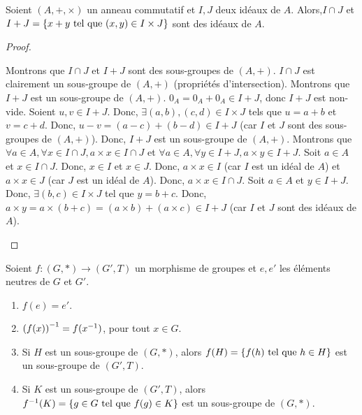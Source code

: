 \documentclass[12pt,a4paper]{report}
\begin{document}
\begin{property}
    Soient $(A,+,\times)$ un anneau commutatif et $I,J$ deux idéaux de $A$. Alors,$I\cap J$ et $I + J = \{x + y \text{ tel que } (x,y) \in I \times J\}$ sont des idéaux de $A$.
\end{property}

\begin{proof}
    \begin{outline}
        \1 Montrons que $I \cap J$ et $I+J$ sont des sous-groupes de $(A,+)$.
            \2 $I\cap J$ est clairement un sous-groupe de $(A,+)$ (propriétés d'intersection).
            \2 Montrons que $I + J$ est un sous-groupe de $(A,+)$.
                \3 $0_A = 0_A + 0_A \in I + J$, donc $I + J$ est non-vide.
                \3 Soient $u,v \in I + J$. Donc, $\exists (a,b), (c,d) \in I \times J$ tels que $u = a + b$ et $v = c + d$.
                \3 Donc, $u - v = (a - c) + (b - d) \in I + J$ (car $I$ et $J$ sont des sous-groupes de $(A,+)$).
            \2 Donc, $I + J$ est un sous-groupe de $(A,+)$.
        \1 Montrons que $\forall a \in A, \forall x \in I \cap J, a \times x \in I \cap J$ et $\forall a \in A, \forall y \in I + J, a \times y \in I + J$.
            \2 Soit $a \in A$ et $x \in I \cap J$. Donc, $x \in I$ et $x \in J$.
            \2 Donc, $a \times x \in I$ (car $I$ est un idéal de $A$) et $a \times x \in J$ (car $J$ est un idéal de $A$).
            \2 Donc, $a \times x \in I \cap J$.
            \2 Soit $a \in A$ et $y \in I + J$. Donc, $\exists (b,c) \in I \times J$ tel que $y = b + c$.
            \2 Donc, $a \times y = a \times (b + c) = (a \times b) + (a \times c) \in I + J$ (car $I$ et $J$ sont des idéaux de $A$).
    \end{outline}
\end{proof}

\begin{property}
    Soient $f:(G,*)\to(G',T)$ un morphisme de groupes et $e, e'$ les éléments neutres de $G$ et $G'$.
    \begin{enumerate}
        \item $f(e) = e'$.
        \item $\left(f(x)\right)^{-1} = f(x^{-1})$, pour tout $x \in G$.
        \item Si $H$ est un sous-groupe de $(G,*)$, alors $f(H)=\{f(h) \text{ tel que } h \in H\}$ est un sous-groupe de $(G',T)$.
        \item Si $K$ est un sous-groupe de $(G',T)$, alors $f^{-1}(K) = \{g \in G \text{ tel que } f(g) \in K\}$ est un sous-groupe de $(G,*)$.
    \end{enumerate}
\end{property}
\end{document}
